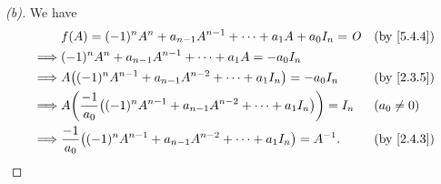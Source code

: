 \begin{proof}[(b)]
  We have
  \begin{align*}
             & f(A) = (-1)^n A^n + a_{n - 1} A^{n - 1} + \cdots + a_1 A + a_0 I_n = \zm                   &  & \text{(by \cref{5.4.4})} \\
    \implies & (-1)^n A^n + a_{n - 1} A^{n - 1} + \cdots + a_1 A = -a_0 I_n                                                             \\
    \implies & A \pa{(-1)^n A^{n - 1} + a_{n - 1} A^{n - 2} + \cdots + a_1 I_n} = -a_0 I_n                &  & \text{(by \cref{2.3.5})} \\
    \implies & A \pa{\frac{-1}{a_0} \pa{(-1)^n A^{n - 1} + a_{n - 1} A^{n - 2} + \cdots + a_1 I_n}} = I_n &  & (a_0 \neq 0)             \\
    \implies & \frac{-1}{a_0} \pa{(-1)^n A^{n - 1} + a_{n - 1} A^{n - 2} + \cdots + a_1 I_n} = A^{-1}.    &  & \text{(by \cref{2.4.3})}
  \end{align*}
\end{proof}

